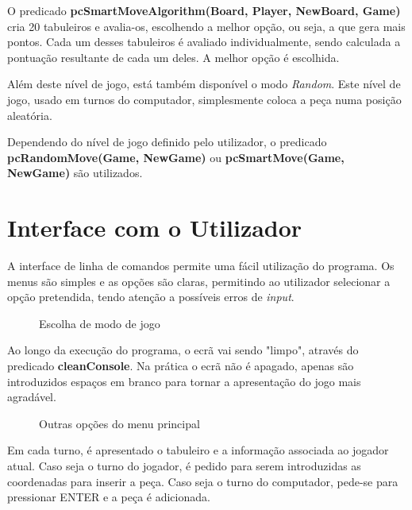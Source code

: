 \documentclass[a4paper]{article}
\begin{document}
O predicado \textbf{pcSmartMoveAlgorithm(Board, Player, NewBoard, Game)} cria 20 tabuleiros e avalia-os, escolhendo a melhor opção, ou seja, a que gera mais pontos. Cada um desses tabuleiros é avaliado individualmente, sendo calculada a pontuação resultante de cada um deles. A melhor opção é escolhida.

Além deste nível de jogo, está também disponível o modo \textit{Random}. Este nível de jogo, usado em turnos do computador, simplesmente coloca a peça numa posição aleatória.

Dependendo do nível de jogo definido pelo utilizador, o predicado \textbf{pcRandomMove(Game, NewGame)} ou \textbf{pcSmartMove(Game, NewGame)} são utilizados.

\newpage

\section{Interface com o Utilizador\newline}

A interface de linha de comandos permite uma fácil utilização do programa. Os menus são simples e as opções são claras, permitindo ao utilizador selecionar a opção pretendida, tendo atenção a possíveis erros de \textit{input}.  

\begin{figure}[!h]
	\centering
	\hfill
	\caption{Escolha de modo de jogo}
\end{figure}

Ao longo da execução do programa, o ecrã vai sendo "limpo", através do predicado \textbf{cleanConsole}. Na prática o ecrã não é apagado, apenas são introduzidos espaços em branco para tornar a apresentação do jogo mais agradável.

\begin{figure}[!h]
	\centering
	\hfill
	\caption{Outras opções do menu principal}
\end{figure}



Em cada turno, é apresentado o tabuleiro e a informação associada ao jogador atual. Caso seja o turno do jogador, é pedido para serem introduzidas as coordenadas para inserir a peça. Caso seja o turno do computador, pede-se para pressionar ENTER e a peça é adicionada. 
\end{document}
